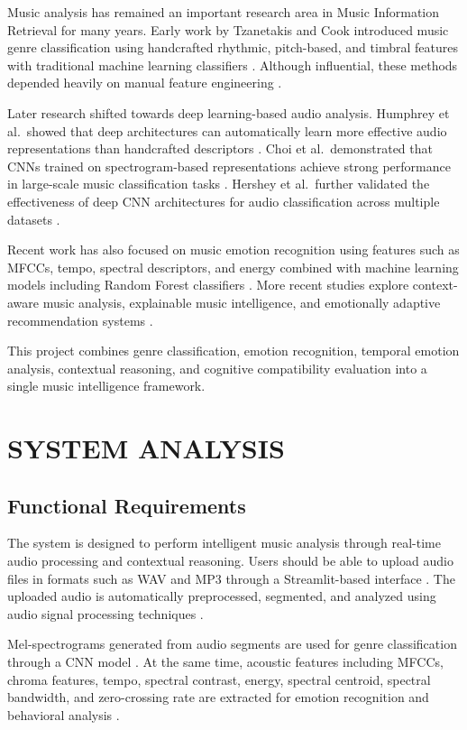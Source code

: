 \documentclass[12pt,a4paper]{report}
\begin{document}
Music analysis has remained an important research area in Music Information Retrieval for many years. Early work by Tzanetakis and Cook introduced music genre classification using handcrafted rhythmic, pitch-based, and timbral features with traditional machine learning classifiers \cite{r1}. Although influential, these methods depended heavily on manual feature engineering \cite{r17}.

Later research shifted towards deep learning-based audio analysis. Humphrey et al.\ showed that deep architectures can automatically learn more effective audio representations than handcrafted descriptors \cite{r7}. Choi et al.\ demonstrated that CNNs trained on spectrogram-based representations achieve strong performance in large-scale music classification tasks \cite{r3}. Hershey et al.\ further validated the effectiveness of deep CNN architectures for audio classification across multiple datasets \cite{r4}.

Recent work has also focused on music emotion recognition using features such as MFCCs, tempo, spectral descriptors, and energy combined with machine learning models including Random Forest classifiers \cite{r9,r14,r24,r25,r26}. More recent studies explore context-aware music analysis, explainable music intelligence, and emotionally adaptive recommendation systems \cite{r27,r28}.

This project combines genre classification, emotion recognition, temporal emotion analysis, contextual reasoning, and cognitive compatibility evaluation into a single music intelligence framework.

\chapter{SYSTEM ANALYSIS}

\section{Functional Requirements}

The system is designed to perform intelligent music analysis through real-time audio processing and contextual reasoning. Users should be able to upload audio files in formats such as WAV and MP3 through a Streamlit-based interface \cite{r21}. The uploaded audio is automatically preprocessed, segmented, and analyzed using audio signal processing techniques \cite{r13,r14}.

Mel-spectrograms generated from audio segments are used for genre classification through a CNN model \cite{r3,r5}. At the same time, acoustic features including MFCCs, chroma features, tempo, spectral contrast, energy, spectral centroid, spectral bandwidth, and zero-crossing rate are extracted for emotion recognition and behavioral analysis \cite{r9,r14}.
\end{document}
